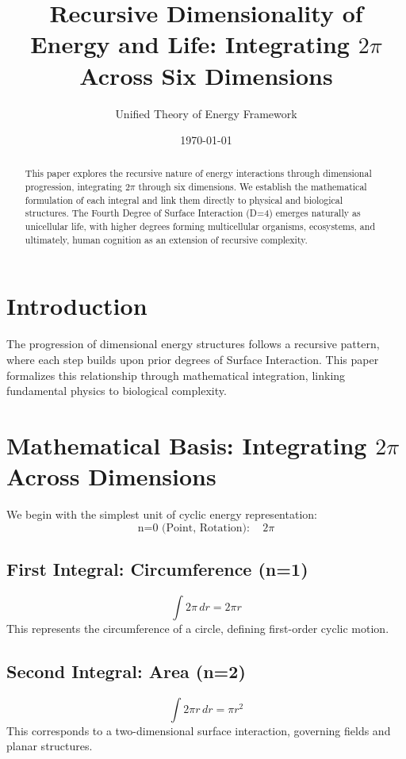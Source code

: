 \documentclass{article}
\title{Recursive Dimensionality of Energy and Life: Integrating $2\pi$ Across Six Dimensions}
\author{Unified Theory of Energy Framework}
\date{\today}
\begin{document}
\maketitle

\begin{abstract}
This paper explores the recursive nature of energy interactions through dimensional progression, integrating $2\pi$ through six dimensions. We establish the mathematical formulation of each integral and link them directly to physical and biological structures. The Fourth Degree of Surface Interaction (D=4) emerges naturally as unicellular life, with higher degrees forming multicellular organisms, ecosystems, and ultimately, human cognition as an extension of recursive complexity.
\end{abstract}

\section{Introduction}
The progression of dimensional energy structures follows a recursive pattern, where each step builds upon prior degrees of Surface Interaction. This paper formalizes this relationship through mathematical integration, linking fundamental physics to biological complexity.

\section{Mathematical Basis: Integrating $2\pi$ Across Dimensions}

We begin with the simplest unit of cyclic energy representation:
\begin{equation}
\text{n=0 (Point, Rotation)}: \quad 2\pi
\end{equation}

\subsection{First Integral: Circumference (n=1)}
\begin{equation}
\int 2\pi \, dr = 2\pi r
\end{equation}
This represents the circumference of a circle, defining first-order cyclic motion.

\subsection{Second Integral: Area (n=2)}
\begin{equation}
\int 2\pi r \, dr = \pi r^2
\end{equation}
This corresponds to a two-dimensional surface interaction, governing fields and planar structures.
\end{document}
